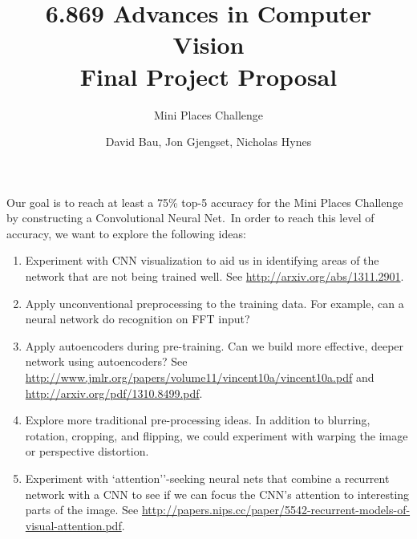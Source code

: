 \documentclass[letterpaper]{scrartcl}
\title{6.869 Advances in Computer Vision\\Final Project Proposal}
\subtitle{Mini Places Challenge}
\author{David Bau, Jon Gjengset, Nicholas Hynes}
\begin{document}
\maketitle

Our goal is to reach at least a 75\% top-5 accuracy for the Mini Places
Challenge by constructing a Convolutional Neural Net.\ In order to reach
this level of accuracy, we want to explore the following ideas:
\begin{enumerate}
\item Experiment with CNN visualization to aid us in identifying
	areas of the network that are not being trained well. See
	\url{http://arxiv.org/abs/1311.2901}.
\item Apply unconventional preprocessing to the training data. For
	example, can a neural network do recognition on FFT input?
\item Apply autoencoders during pre-training. Can we build more
	effective, deeper network using autoencoders? See
	\url{http://www.jmlr.org/papers/volume11/vincent10a/vincent10a.pdf}
	and \url{http://arxiv.org/pdf/1310.8499.pdf}.
\item Explore more traditional pre-processing ideas. In addition to
	blurring, rotation, cropping, and flipping, we could experiment
	with warping the image or perspective distortion.
\item Experiment with `attention''-seeking neural nets that combine a
	recurrent network with a CNN to see if we can focus the CNN's
	attention to interesting parts of the image. See
	\url{http://papers.nips.cc/paper/5542-recurrent-models-of-visual-attention.pdf}.
\end{enumerate}
\end{document}
